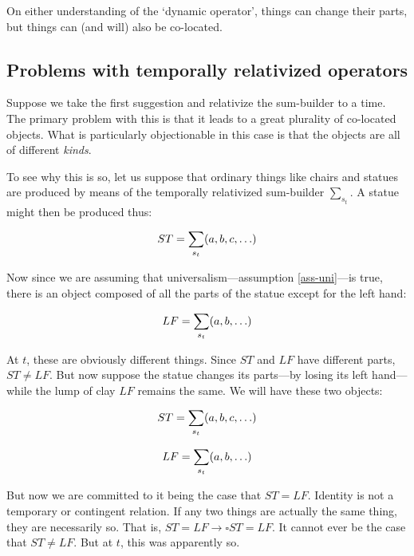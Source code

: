 \documentclass[11pt]{article}
\begin{document}
\begin{spacing}{1.5}
On either understanding of the `dynamic operator', things can change
their parts, but things can (and will) also be co-located.

\subsection{Problems with temporally relativized operators}
\label{problems2a}
Suppose we take the first suggestion and relativize the sum-builder to
a time.  The primary problem with this is that it leads to a great
plurality of co-located objects.  What is particularly objectionable
in this case is that the objects are all of different {\em kinds}.

To see why this is so, let us suppose that ordinary things like chairs
and statues are produced by means of the temporally relativized
sum-builder $\sum_{s_t}$.  A statue might then be produced thus:

\begin{displaymath}
ST = \sum_{s_t} (a, b, c, \mathellipsis )
\end{displaymath}

Now since we are assuming that universalism---assumption
\ref{ass-uni}---is true, there is an object composed of all the parts
of the statue except for the left hand:

\begin{displaymath}
LF = \sum_{s_t} (a, b, \mathellipsis )
\end{displaymath}

At $t$, these are obviously different things.  Since $ST$ and $LF$
have different parts, $ST \neq LF$.  But now suppose the statue
changes its parts---by losing its left hand---while the lump of clay
$LF$ remains the same.  We will have these two objects:

\begin{displaymath}
ST = \sum_{s_t} (a, b, c, \mathellipsis )
\end{displaymath}

\begin{displaymath}
LF = \sum_{s_t} (a, b, \mathellipsis )
\end{displaymath}

But now we are committed to it being the case that $ST = LF$.
Identity is not a temporary or contingent relation.  If any two things
are actually the same thing, they are necessarily so.  That is, $ST =
LF \rightarrow \square ST = LF$.  It cannot ever be the case that $ST
\neq LF$.  But at $t$, this was apparently so.


\end{spacing}
\end{document}
